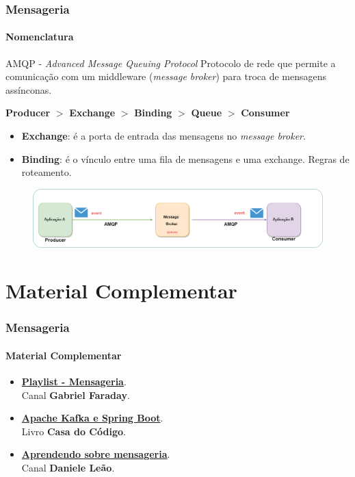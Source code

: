 \documentclass[
	9pt, %
	t, %
]{beamer}
\newcommand{\iconLink}[2]{\href{#1}{\faLink \hspace{0.2em} {#2}}}
\newcommand{\yellowbox}[1]{\colorbox{yellow!75}{#1}}
\begin{document}
\begin{frame}
	\frametitle{Mensageria}
	\framesubtitle{Nomenclatura}

	\begin{block}{AMQP - \textit{Advanced Message Queuing Protocol}}
		Protocolo de rede que permite a comunicação com um middleware (\textit{message broker}) para troca de mensagens assínconas. \\ \smallskip

		\begin{center}
			\textbf{Producer} $>$ \yellowbox{\textbf{Exchange} $>$ \textbf{Binding} $>$ \textbf{Queue}} $>$ \textbf{Consumer}
		\end{center}

		\begin{itemize}
			\item \textbf{Exchange}: é a porta de entrada das mensagens no \textit{message broker}.
			\item \textbf{Binding}: é o vínculo entre uma fila de mensagens e uma exchange. Regras de roteamento.
		\end{itemize}
	\end{block}

	\begin{figure}
		\centering
		\includegraphics[width=0.9\linewidth]{Images/message_broker.png}
	\end{figure}

\end{frame}

\section{Material Complementar}

\begin{frame}
	\frametitle{Mensageria}
	\framesubtitle{Material Complementar}

	\begin{itemize}
		\item \iconLink{https://www.youtube.com/playlist?list=PLqONbZa3fPe4Z6sg7RQGaHlYqUjsliKAH}{\textbf{Playlist - Mensageria}}.\\Canal \textbf{Gabriel Faraday}.
		\item \iconLink{https://www.youtube.com/watch?v=A3gmE5yC97g}{\textbf{Apache Kafka e Spring Boot}}.\\Livro \textbf{Casa do Código}.
		\item \iconLink{https://www.casadocodigo.com.br/products/livro-apache-kafka}{\textbf{Aprendendo sobre mensageria}}.\\Canal \textbf{Daniele Leão}.
	\end{itemize}

\end{frame}
\end{document}
